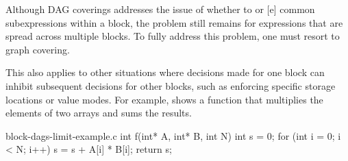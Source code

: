 Although \glspl{DAG covering} addresses the issue of whether to  or [e] common subexpressions within a
\gls{block}, the problem still remains for expressions that are spread across
multiple \glspl{block}.
%
To fully address this problem, one must resort to \gls{graph covering}.

This also applies to other situations where decisions made for one \gls{block}
can inhibit subsequent decisions for other \glspl{block}, such as enforcing
specific storage locations or value modes.
%
For example,  shows a \gls{function} that
multiplies the elements of two arrays and sums the results.
%
\begin{filecontents*}{block-dags-limit-example.c}
int f(int* A, int* B, int N) {
  int s = 0;
  for (int i = 0; i < N; i++) {
    s = s + A[i] * B[i];
  }
  return s;
}
\end{filecontents*}
%
